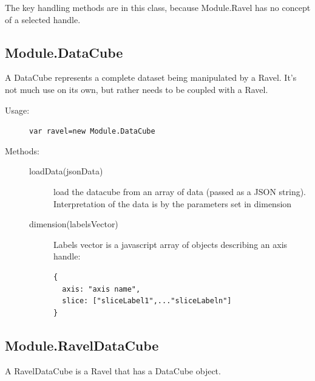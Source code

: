 \documentclass{article}
\begin{document}
The key handling methods are in this class, because Module.Ravel has
no concept of a selected handle.

\subsection{Module.DataCube}

A DataCube represents a complete dataset being manipulated by a
Ravel. It's not much use on its own, but rather needs to be coupled
with a Ravel.

\begin{description}
\item[Usage:] \verb+var ravel=new Module.DataCube+

\item[Methods:]\mbox{}
\begin{description}
\item[loadData(jsonData)] load the datacube from an array of data
  (passed as a JSON string). Interpretation of the data is by the
  parameters set in dimension
\item[dimension(labelsVector)] Labels vector is a javascript array of
  objects describing an axis handle:
\begin{verbatim}
{
  axis: "axis name",
  slice: ["sliceLabel1",..."sliceLabeln"]
} 
\end{verbatim}
\end{description}
\end{description}

\subsection{Module.RavelDataCube}

A RavelDataCube is a Ravel that has a DataCube object.
\end{document}
